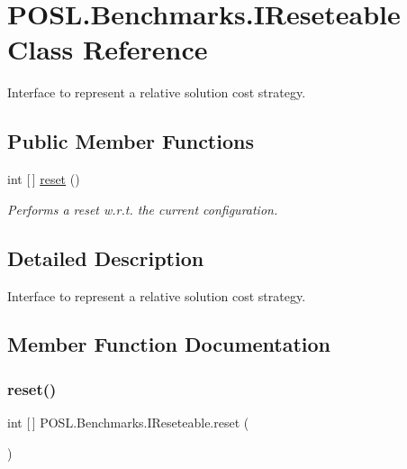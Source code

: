 \hypertarget{interfacePOSL_1_1Benchmarks_1_1IReseteable}{}\section{P\+O\+S\+L.\+Benchmarks.\+I\+Reseteable Class Reference}
\label{interfacePOSL_1_1Benchmarks_1_1IReseteable}


Interface to represent a relative solution cost strategy.  


\subsection*{Public Member Functions}
\begin{DoxyCompactItemize}
\item 
int \mbox{[}$\,$\mbox{]} \hyperlink{interfacePOSL_1_1Benchmarks_1_1IReseteable_a79beca76a4dd94b2543aa34d8c0adbc9}{reset} ()
\begin{DoxyCompactList}\small\item\em Performs a reset w.\+r.\+t. the current configuration. \end{DoxyCompactList}\end{DoxyCompactItemize}


\subsection{Detailed Description}
Interface to represent a relative solution cost strategy. 

\subsection{Member Function Documentation}
\mbox{\label{interfacePOSL_1_1Benchmarks_1_1IReseteable_a79beca76a4dd94b2543aa34d8c0adbc9}} 
\subsubsection{\texorpdfstring{reset()}{reset()}}
{\footnotesize\ttfamily int \mbox{[}$\,$\mbox{]} P\+O\+S\+L.\+Benchmarks.\+I\+Reseteable.\+reset (\begin{DoxyParamCaption}{ }\end{DoxyParamCaption})}



